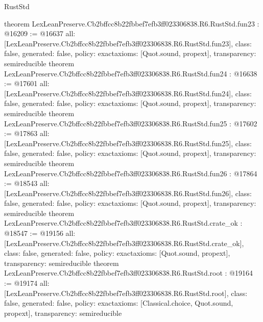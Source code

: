 \begin{lexlean}{RustStd}
\begin{coremodule}
{}
theorem LexLeanPreserve.Cb2bffcc8b22fbbef7efb3ff023306838.R6.RustStd.fun23 : @16209 := @16637 {
  all: [LexLeanPreserve.Cb2bffcc8b22fbbef7efb3ff023306838.R6.RustStd.fun23],
  class: false,
  generated: false,
  policy: exact{axioms: [Quot.sound, propext]},
  transparency: semireducible
}
theorem LexLeanPreserve.Cb2bffcc8b22fbbef7efb3ff023306838.R6.RustStd.fun24 : @16638 := @17601 {
  all: [LexLeanPreserve.Cb2bffcc8b22fbbef7efb3ff023306838.R6.RustStd.fun24],
  class: false,
  generated: false,
  policy: exact{axioms: [Quot.sound, propext]},
  transparency: semireducible
}
theorem LexLeanPreserve.Cb2bffcc8b22fbbef7efb3ff023306838.R6.RustStd.fun25 : @17602 := @17863 {
  all: [LexLeanPreserve.Cb2bffcc8b22fbbef7efb3ff023306838.R6.RustStd.fun25],
  class: false,
  generated: false,
  policy: exact{axioms: [Quot.sound, propext]},
  transparency: semireducible
}
theorem LexLeanPreserve.Cb2bffcc8b22fbbef7efb3ff023306838.R6.RustStd.fun26 : @17864 := @18543 {
  all: [LexLeanPreserve.Cb2bffcc8b22fbbef7efb3ff023306838.R6.RustStd.fun26],
  class: false,
  generated: false,
  policy: exact{axioms: [Quot.sound, propext]},
  transparency: semireducible
}
theorem LexLeanPreserve.Cb2bffcc8b22fbbef7efb3ff023306838.R6.RustStd.crate_ok : @18547 := @19156 {
  all: [LexLeanPreserve.Cb2bffcc8b22fbbef7efb3ff023306838.R6.RustStd.crate_ok],
  class: false,
  generated: false,
  policy: exact{axioms: [Quot.sound, propext]},
  transparency: semireducible
}
theorem LexLeanPreserve.Cb2bffcc8b22fbbef7efb3ff023306838.R6.RustStd.root : @19164 := @19174 {
  all: [LexLeanPreserve.Cb2bffcc8b22fbbef7efb3ff023306838.R6.RustStd.root],
  class: false,
  generated: false,
  policy: exact{axioms: [Classical.choice, Quot.sound, propext]},
  transparency: semireducible
}


\end{coremodule}
\end{lexlean}
